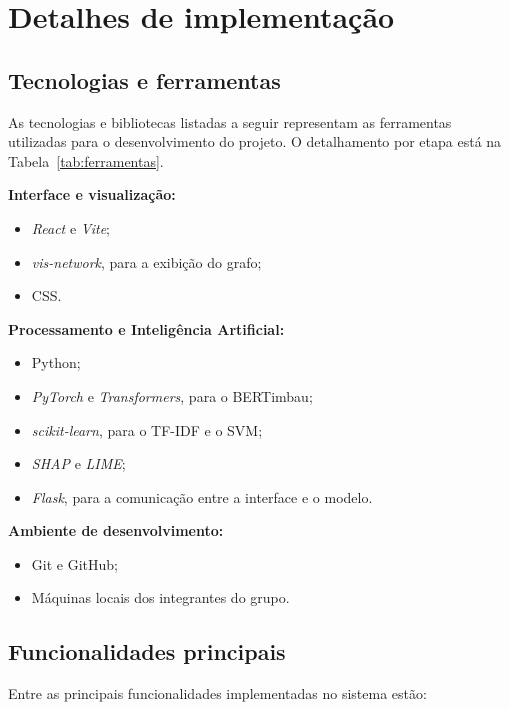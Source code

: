 \documentclass[
    12pt,                %
    openright,           %
    oneside,             %
    a4paper,             %
    english,             %
    brazil               %
]{abntex2}
\begin{document}
\section{Detalhes de implementação}
\subsection{Tecnologias e ferramentas}

As tecnologias e bibliotecas listadas a seguir representam as ferramentas 
utilizadas para o desenvolvimento do projeto. O detalhamento por etapa 
está na Tabela~\ref{tab:ferramentas}.

\textbf{Interface e visualização:}

\begin{itemize}
    \item \textit{React} e \textit{Vite};
    \item \textit{vis-network}, para a exibição do grafo;
    \item CSS.
\end{itemize}

\textbf{Processamento e Inteligência Artificial:}

\begin{itemize}
    \item Python;
    \item \textit{PyTorch} e \textit{Transformers}, para o BERTimbau;
    \item \textit{scikit-learn}, para o TF-IDF e o SVM;
    \item \textit{SHAP} e \textit{LIME};
    \item \textit{Flask}, para a comunicação entre a interface e o modelo.
\end{itemize}

\textbf{Ambiente de desenvolvimento:}

\begin{itemize}
    \item Git e GitHub;
    \item Máquinas locais dos integrantes do grupo.
\end{itemize}

\subsection{Funcionalidades principais}

Entre as principais funcionalidades implementadas no sistema estão:
\end{document}
